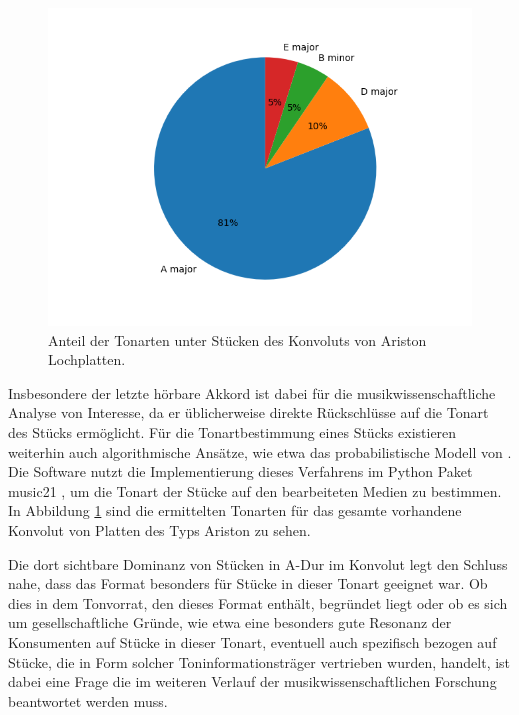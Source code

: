 \begin{figure}[t]
    \centering
    \includegraphics[width=\textwidth]{graphics/pie.png}
    \caption{Anteil der Tonarten unter Stücken des Konvoluts von Ariston Lochplatten.}
    \label{keys}
\end{figure}

Insbesondere der letzte hörbare Akkord ist dabei für die musikwissenschaftliche Analyse von Interesse, da er üblicherweise direkte Rückschlüsse auf die Tonart des Stücks ermöglicht.
Für die Tonartbestimmung eines Stücks existieren weiterhin auch algorithmische Ansätze, wie etwa das probabilistische Modell von \textcite[]{temperley_2002}.
Die  Software nutzt die Implementierung dieses Verfahrens im Python Paket music21 \parencite[]{music21}, um die Tonart der Stücke auf den bearbeiteten Medien zu bestimmen.
In Abbildung \ref{keys} sind die ermittelten Tonarten für das gesamte vorhandene Konvolut von Platten des Typs Ariston zu sehen.

Die dort sichtbare Dominanz von Stücken in A-Dur im Konvolut legt den Schluss nahe, dass das Format besonders für Stücke in dieser Tonart geeignet war.
Ob dies in dem Tonvorrat, den dieses Format enthält, begründet liegt oder ob es sich um gesellschaftliche Gründe, wie etwa eine besonders gute Resonanz der Konsumenten auf Stücke in dieser Tonart, eventuell auch spezifisch bezogen auf Stücke, die in Form solcher Toninformationsträger vertrieben wurden, handelt, ist dabei eine Frage die im weiteren Verlauf der musikwissenschaftlichen Forschung beantwortet werden muss.

